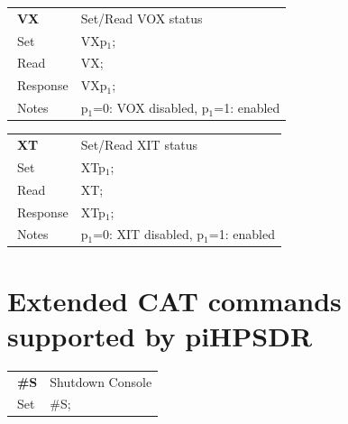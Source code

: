 \documentclass[12pt]{book}
\def\pH{pi\-HPSDR }
\begin{document}
\begin{center}
\begin{tabular}{|p{2cm}|p{11cm}|}
\toprule
$\phantom{\Big|}$\textbf{\large VX} & Set/Read VOX status \\\cline{1-2}
$\phantom{\Big|}${\large Set} & {VXp$_1$;} \\\hline
$\phantom{\Big|}${\large Read} & {VX;} \\\hline
$\phantom{\Big|}${\large Response} & {VXp$_1$;} \\\hline
$\phantom{\Big|}${\large Notes} & \multicolumn{1}{|p{11cm}|}{p$_1$=0: VOX disabled, p$_1$=1: enabled} \\
\bottomrule
\end{tabular}
\end{center}

\begin{center}
\begin{tabular}{|p{2cm}|p{11cm}|}
\toprule
$\phantom{\Big|}$\textbf{\large XT} & Set/Read XIT status \\\cline{1-2}
$\phantom{\Big|}${\large Set} & {XTp$_1$;} \\\hline
$\phantom{\Big|}${\large Read} & {XT;} \\\hline
$\phantom{\Big|}${\large Response} & {XTp$_1$;} \\\hline
$\phantom{\Big|}${\large Notes} & \multicolumn{1}{|p{11cm}|}{p$_1$=0: XIT disabled, p$_1$=1: enabled} \\
\bottomrule
\end{tabular}
\end{center}



\section[Extended CAT commands]{Extended CAT commands supported by \pH}

\begin{center}
\begin{tabular}{|p{2cm}|p{11cm}|}
\toprule
$\phantom{\Big|}$\textbf{\large \#S} & Shutdown Console \\\cline{1-2}
$\phantom{\Big|}${\large Set} & {\#S;} \\\hline
\bottomrule
\end{tabular}
\end{center}
\end{document}
